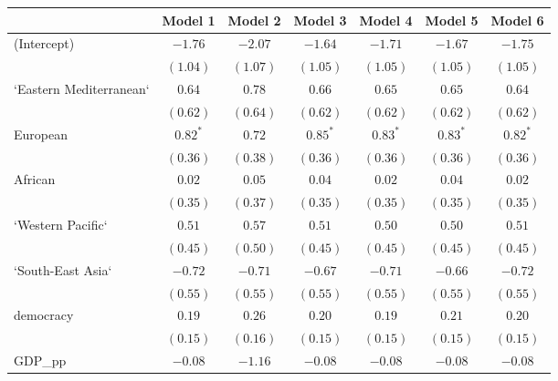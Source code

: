 
\begin{table}[!h]
\begin{center}
\begin{tabular}{l c c c c c c }
\toprule
 & Model 1 & Model 2 & Model 3 & Model 4 & Model 5 & Model 6 \\
\midrule
(Intercept)             & $-1.76$      & $-2.07$      & $-1.64$      & $-1.71$      & $-1.67$      & $-1.75$      \\
                        & $(1.04)$     & $(1.07)$     & $(1.05)$     & $(1.05)$     & $(1.05)$     & $(1.05)$     \\
`Eastern Mediterranean` & $0.64$       & $0.78$       & $0.66$       & $0.65$       & $0.65$       & $0.64$       \\
                        & $(0.62)$     & $(0.64)$     & $(0.62)$     & $(0.62)$     & $(0.62)$     & $(0.62)$     \\
European                & $0.82^{*}$   & $0.72$       & $0.85^{*}$   & $0.83^{*}$   & $0.83^{*}$   & $0.82^{*}$   \\
                        & $(0.36)$     & $(0.38)$     & $(0.36)$     & $(0.36)$     & $(0.36)$     & $(0.36)$     \\
African                 & $0.02$       & $0.05$       & $0.04$       & $0.02$       & $0.04$       & $0.02$       \\
                        & $(0.35)$     & $(0.37)$     & $(0.35)$     & $(0.35)$     & $(0.35)$     & $(0.35)$     \\
`Western Pacific`       & $0.51$       & $0.57$       & $0.51$       & $0.50$       & $0.50$       & $0.51$       \\
                        & $(0.45)$     & $(0.50)$     & $(0.45)$     & $(0.45)$     & $(0.45)$     & $(0.45)$     \\
`South-East Asia`       & $-0.72$      & $-0.71$      & $-0.67$      & $-0.71$      & $-0.66$      & $-0.72$      \\
                        & $(0.55)$     & $(0.55)$     & $(0.55)$     & $(0.55)$     & $(0.55)$     & $(0.55)$     \\
democracy               & $0.19$       & $0.26$       & $0.20$       & $0.19$       & $0.21$       & $0.20$       \\
                        & $(0.15)$     & $(0.16)$     & $(0.15)$     & $(0.15)$     & $(0.15)$     & $(0.15)$     \\
GDP\_pp                 & $-0.08$      & $-1.16$      & $-0.08$      & $-0.08$      & $-0.08$      & $-0.08$      \\

\end{tabular}
\end{center}
\end{table}
